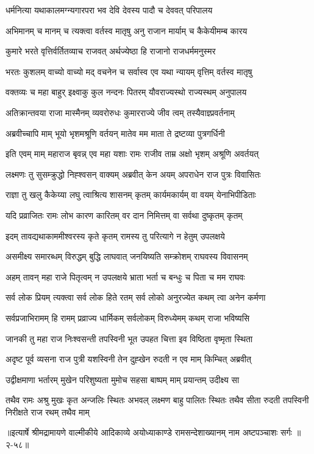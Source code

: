 \twolineshloka
{धर्मनित्या यथाकालमग्न्यगारपरा भव}
{देवि देवस्य पादौ च देववत् परिपालय} %

\twolineshloka
{अभिमानम् च मानम् च त्यक्त्वा वर्तस्व मातृषु}
{अनु राजान मार्याम् च कैकेयीमम्ब कारय} %

\twolineshloka
{कुमारे भरते वृत्तिर्वर्तितव्याच राजवत्}
{अर्थज्येष्ठा हि राजानो राजधर्ममनुस्मर} %

\twolineshloka
{भरतः कुशलम् वाच्यो वाच्यो मद् वचनेन च}
{सर्वास्व एव यथा न्यायम् वृत्तिम् वर्तस्व मातृषु} %

\twolineshloka
{वक्तव्यः च महा बाहुर् इक्ष्वाकु कुल नन्दनः}
{पितरम् यौवराज्यस्थो राज्यस्थम् अनुपालय} %

\twolineshloka
{अतिक्रान्तवया राजा मास्मैनम् व्यवरोरुधः}
{कुमारराज्ये जीव त्वम् तस्यैवाज्ञ्प्रवर्तनाम्} %

\twolineshloka
{अब्रवीच्चापि माम् भूयो भृशमश्रूणि वर्तयन्}
{मातेव मम माता ते द्रष्टव्या पुत्रगर्धिनी} %

\twolineshloka
{इति एवम् माम् महाराज बृवन्न् एव महा यशाः}
{रामः राजीव ताम्र अक्षो भृशम् अश्रूणि अवर्तयत्} %

\twolineshloka
{लक्ष्मणः तु सुसम्क्रुद्धो निह्श्वसन् वाक्यम् अब्रवीत्}
{केन अयम् अपराधेन राज पुत्रः विवासितः} %

\twolineshloka
{राज्ञा तु खलु कैकेय्या लघु त्वाश्रित्य शासनम्}
{कृतम् कार्यमकार्यम् वा वयम् येनाभिपीडिताः} %

\twolineshloka
{यदि प्रव्राजितः रामः लोभ कारण कारितम्}
{वर दान निमित्तम् वा सर्वथा दुष्कृतम् कृतम्} %

\twolineshloka
{इदम् तावद्यथाकाममीश्वरस्य कृते कृतम्}
{रामस्य तु परित्यागे न हेतुम् उपलक्षये} %

\twolineshloka
{असमीक्ष्य समारब्धम् विरुद्धम् बुद्धि लाघवात्}
{जनयिष्यति सम्क्रोशम् राघवस्य विवासनम्} %

\twolineshloka
{अहम् तावन् महा राजे पितृत्वम् न उपलक्षये}
{भ्राता भर्ता च बन्धुः च पिता च मम राघवः} %

\twolineshloka
{सर्व लोक प्रियम् त्यक्त्वा सर्व लोक हिते रतम्}
{सर्व लोको अनुरज्येत कथम् त्वा अनेन कर्मणा} %

\twolineshloka
{सर्वप्रजाभिरामम् हि रामम् प्रव्राज्य धार्मिकम्}
{सर्वलोकम् विरुध्येमम् कथम् राजा भविष्यसि} %

\twolineshloka
{जानकी तु महा राज निःश्वसन्ती तपस्विनी}
{भूत उपहत चित्ता इव विष्ठिता वृष्मृता स्थिता} %

\twolineshloka
{अदृष्ट पूर्व व्यसना राज पुत्री यशस्विनी}
{तेन दुह्खेन रुदती न एव माम् किम्चित् अब्रवीत्} %

\twolineshloka
{उद्वीक्षमाणा भर्तारम् मुखेन परिशुष्यता}
{मुमोच सहसा बाष्पम् माम् प्रयान्तम् उदीक्ष्य सा} %

\fourlineindentedshloka
{तथैव रामः अश्रु मुखः कृत अन्जलिः}
{स्थितः अभवल् लक्ष्मण बाहु पालितः स्थितः}
{तथैव सीता रुदती तपस्विनी}
{निरीक्षते राज रथम् तथैव माम्} %


॥इत्यार्षे श्रीमद्रामायणे वाल्मीकीये आदिकाव्ये अयोध्याकाण्डे रामसन्देशाख्यानम् नाम अष्टपञ्चाशः सर्गः ॥२-५८॥
